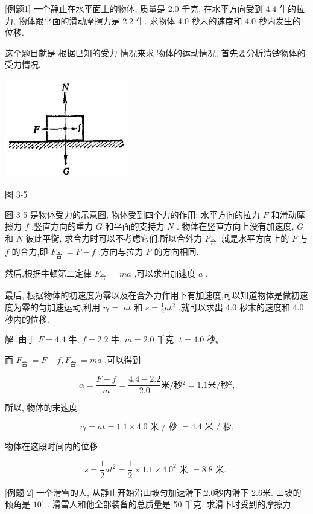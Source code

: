 \documentclass[10pt]{article}
\begin{document}
[例题1] 一个静止在水平面上的物体, 质量是 2.0 千克, 在水平方向受到 4.4 牛的拉力, 物体跟平面的滑动摩擦力是 2.2 牛. 求物体 4.0 秒末的速度和 4.0 秒内发生的位移.

这个题目就是 根据已知的受力 情况来求 物体的运动情况, 首先要分析清楚物体的受力情况.

\begin{center}
\includegraphics[max width=0.4\textwidth]{images/01912d55-147c-70aa-b0e0-1782a122f948_105_477783.jpg}
\end{center}

图 3-5

图 3-5 是物体受力的示意图, 物体受到四个力的作用: 水平方向的拉力 \(F\) 和滑动摩擦力 \(f\) ,竖直方向的重力 \(G\) 和平面的支持力 \(N\) . 物体在竖直方向上没有加速度, \(G\) 和 \(N\) 彼此平衡, 求合力时可以不考虑它们,所以合外力 \({F}_{\text{合 }}\) 就是水平方向上的 \(F\) 与 \(f\) 的合力,即 \({F}_{\text{合 }} = F - f\) ,方向与拉力 \(F\) 的方向相同.

然后,根据牛顿第二定律 \({F}_{\text{合 }} = {ma}\) ,可以求出加速度 \(a\) .

最后, 根据物体的初速度为零以及在合外力作用下有加速度,可以知道物体是做初速度为零的匀加速运动,利用 \({v}_{t} =\) \({at}\) 和 \(s = \frac{1}{2}a{t}^{2}\) ,就可以求出 4.0 秒末的速度和 4.0 秒内的位移.

解: 由于 \(F = {4.4}\) 牛, \(f = {2.2}\) 牛, \(m = {2.0}\) 千克, \(t = {4.0}\) 秒。

而 \({F}_{\text{合 }} = F - f,{F}_{\text{合 }} = {ma}\) ,可以得到

\[
\alpha = \frac{F - f}{m} = \frac{{4.4} - {2.2}}{2.0}\text{米}/秒{}^{2} = {1.1}\text{米}/秒{}^{2}\text{,}
\]

所以, 物体的末速度

\[
{v}_{t} = {at} = {1.1} \times {4.0}\text{ 米 }/\text{ 秒 } = {4.4}\text{ 米 }/\text{ 秒,}
\]

物体在这段时间内的位移

\[
s = \frac{1}{2}a{t}^{2} = \frac{1}{2} \times {1.1} \times {4.0}^{2}\text{ 米 } = {8.8}\text{ 米. }
\]

[例题 2] 一个滑雪的人, 从静止开始沿山坡匀加速滑下,2.0秒内滑下 2.6米. 山坡的倾角是 \({10}^{ \circ }\) . 滑雪人和他全部装备的总质量是 50 千克. 求滑下时受到的摩擦力.
\end{document}
